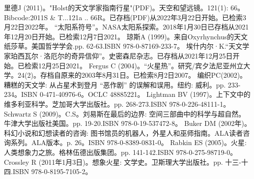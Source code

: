 \begin{enumerate}
 里德J (2011)。"Holst的天文学家指南行星"(PDF)。天空和望远镜。121(1): 66。Bibcode:2011S & T...121a .. 66R。已存档(PDF)从2022年3月22日开始。已检索3月22日2022年。
 “太阳系符号”。NASA太阳系探索。2018年1月30日已存档从2021年12月20日开始。已检索12月7日2021。
 琼斯A (1999)。来自Oxyrhynchus的天文纸莎草。美国哲学学会.pp. 62-63.ISBN  978-0-87169-233-7。
 埃什内尔·K.“天文学家珀西瓦尔·洛厄尔的奇异信仰”。史密森尼杂志。已存档从2021年12月25日开始。已检索12月25日2021。
 Fergus C (2004)。“火星热”。研究/宾夕法尼亚州立大学。24(2)。存档自原来的2003年8月31日。已检索8月2日2007。
 编织PC(2002)。糟糕的天文学: 从占星术到登月 “恶作剧” 的误解和误用。纽约: 威利。pp. 233-234。ISBN 0-471-40976-6。OCLC 48885221。
 Lightman BV (1997)。上下文中的维多利亚科学。芝加哥大学出版社。pp. 268-273.ISBN 978-0-226-48111-1。
 Schwartz S (2009)。C.S。刘易斯在最后的边界: 空间三部曲中的科学与超自然。牛津大学出版社美国。pp. 19-20.ISBN 978-0-19-537472-8。
 Buker DM (2002年)。科幻小说和幻想读者的咨询: 图书馆员的机器人，外星人和巫师指南。ALA读者咨询系列。ALA版本。p. 26。ISBN 978-0-8389-0831-0。
 Rabkin ES (2005)。火星: 人类想象力之旅。格林伍德出版集团。pp. 141-142.ISBN 978-0-275-98719-0。
 Crossley R (2011年1月3日)。想象火星: 文学史。卫斯理大学出版社。pp. 十三-十四.ISBN 978-0-8195-7105-2。


\end{enumerate}